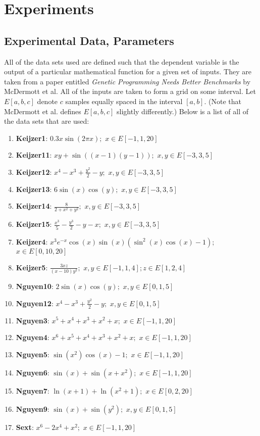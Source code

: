 
\section{Experiments}\label{sect:experiments}

\subsection{Experimental Data, Parameters}\label{sect:data_sets}

All of the data sets used are defined such that the dependent variable is the output of a particular mathematical function for a given set of inputs.  They are taken from a paper entitled \textit{Genetic Programming Needs Better Benchmarks} by McDermott et al. \cite{benchmarks}  All of the inputs are taken to form a grid on some interval.  Let $E[a, b, c]$ denote $c$ samples equally spaced in the interval $[a,b]$. (Note that McDermott et al. defines $E[a, b, c]$ slightly differently.)  Below is a list of all of the data sets that are used:

\begin{enumerate}[noitemsep]
\item \textbf{Keijzer1}: $0.3x \sin(2 \pi x);$ $x \in E[-1,1,20]$
\item \textbf{Keijzer11}: $x y+\sin((x-1)(y-1));$ $x, y \in E[-3,3,5]$
\item \textbf{Keijzer12}: $x^{4}-x^{3}+\frac{y^{2}}{2}-y;$ $x, y \in E[-3,3,5]$
\item \textbf{Keijzer13}: $6 \sin(x) \cos(y);$ $x, y \in E[-3,3,5]$
\item \textbf{Keijzer14}: $\frac{8}{2 + x^{2} + y^{2}};$ $x,y \in E[-3,3,5]$
\item \textbf{Keijzer15}: $\frac{x^{3}}{5} - \frac{y^{3}}{2} - y - x;$ $x, y \in E[-3,3,5]$
\item \textbf{Keijzer4}: $x^{3} e^{-x} \cos(x) \sin(x) (\sin^{2}(x) \cos(x) - 1);$ $x \in E[0,10,20]$
\item \textbf{Keijzer5}: $\frac{3 x z}{(x - 10) y^{2}};$ $x,y \in E[-1,1,4]; z \in E[1,2,4]$
\item \textbf{Nguyen10}: $2 \sin(x) \cos(y);$ $x,y \in E[0,1,5]$
\item \textbf{Nguyen12}: $x^{4} - x^{3} + \frac{y^{2}}{2} - y;$ $x,y \in E[0,1,5]$
\item \textbf{Nguyen3}: $x^{5} + x^{4} + x^{3} + x^{2} + x;$ $x \in E[-1,1,20]$
\item \textbf{Nguyen4}: $x^{6} + x^{5} + x^{4} + x^{3} + x^{2} + x;$ $x \in E[-1,1,20]$
\item \textbf{Nguyen5}: $\sin(x^{2}) \cos(x) - 1;$ $x \in E[-1,1,20]$
\item \textbf{Nguyen6}: $\sin(x) + \sin(x + x^{2});$ $x \in E[-1,1,20]$
\item \textbf{Nguyen7}: $\ln(x + 1) + \ln(x^{2} + 1);$ $x \in E[0,2,20]$
\item \textbf{Nguyen9}: $\sin(x) + \sin(y^{2});$ $x,y \in E[0,1,5]$
\item \textbf{Sext}: $x^{6} - 2 x^{4} + x^{2};$ $x \in E[-1,1,20]$
\end{enumerate}


